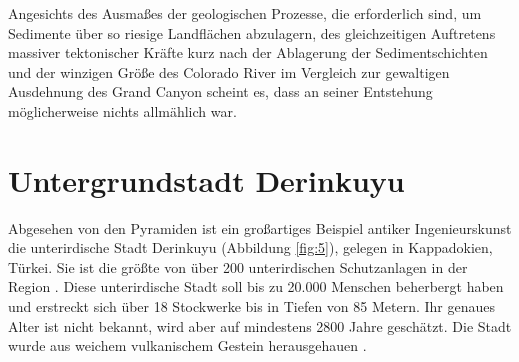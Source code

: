 \documentclass[10pt,twocolumn,letterpaper]{article}
\begin{document}
Angesichts des Ausmaßes der geologischen Prozesse, die erforderlich sind, um Sedimente über so riesige Landflächen abzulagern, des gleichzeitigen Auftretens massiver tektonischer Kräfte kurz nach der Ablagerung der Sedimentschichten und der winzigen Größe des Colorado River im Vergleich zur gewaltigen Ausdehnung des Grand Canyon scheint es, dass an seiner Entstehung möglicherweise nichts allmählich war.

\section{Untergrundstadt Derinkuyu}

Abgesehen von den Pyramiden ist ein großartiges Beispiel antiker Ingenieurskunst die unterirdische Stadt Derinkuyu (Abbildung \ref{fig:5}), gelegen in Kappadokien, Türkei. Sie ist die größte von über 200 unterirdischen Schutzanlagen in der Region \cite{54}. Diese unterirdische Stadt soll bis zu 20.000 Menschen beherbergt haben und erstreckt sich über 18 Stockwerke bis in Tiefen von 85 Metern. Ihr genaues Alter ist nicht bekannt, wird aber auf mindestens 2800 Jahre geschätzt. Die Stadt wurde aus weichem vulkanischem Gestein herausgehauen \cite{52, 53}.
\end{document}
